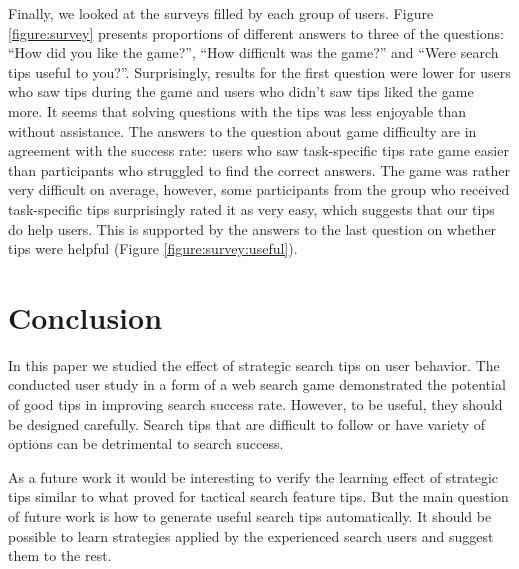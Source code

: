 \documentclass{sig-alternate}
\begin{document}
Finally, we looked at the surveys filled by each group of users.
Figure \ref{figure:survey} presents proportions of different answers to three of the questions: ``How did you like the game?'', ``How difficult was the game?'' and ``Were search tips useful to you?''.
Surprisingly, results for the first question were lower for users who saw tips during the game and users who didn't saw tips liked the game more.
It seems that solving questions with the tips was less enjoyable than without assistance.
The answers to the question about game difficulty are in agreement with the success rate: users who saw task-specific tips rate game easier than participants who struggled to find the correct answers.
The game was rather very difficult on average, however, some participants from the group who received task-specific tips surprisingly rated it as very easy, which suggests that our tips do help users.
This is supported by the answers to the last question on whether tips were helpful (Figure \ref{figure:survey:useful}).


\section{Conclusion}
In this paper we studied the effect of strategic search tips on user behavior.
The conducted user study in a form of a web search game demonstrated the potential of good tips in improving search success rate.
However, to be useful, they should be designed carefully.
Search tips that are difficult to follow or have variety of options can be detrimental to search success.

As a future work it would be interesting to verify the learning effect of strategic tips similar to what \cite{Moraveji:2011:MIU:2009916.2009966} proved for tactical search feature tips.
But the main question of future work is how to generate useful search tips automatically.
It should be possible to learn strategies applied by the experienced search users and suggest them to the rest.


%

%
%
\end{document}
